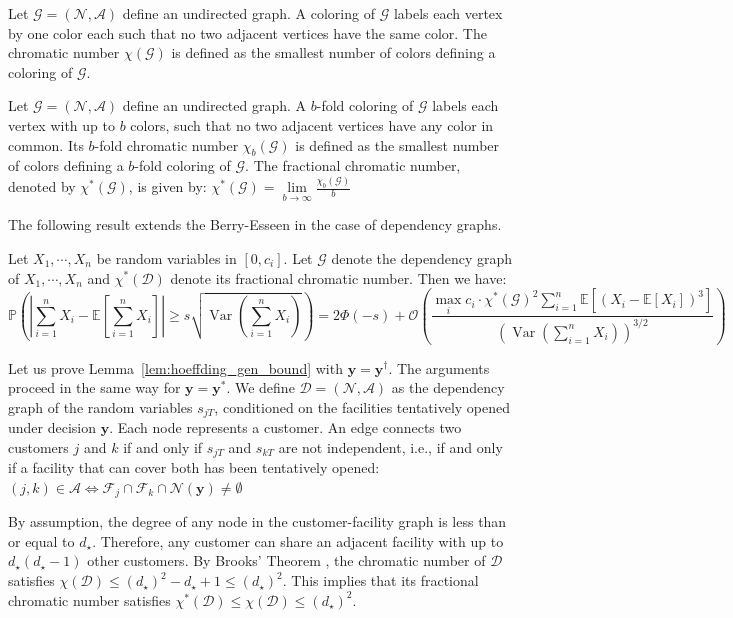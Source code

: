 \documentclass[nonblindrev]{informs3noheader}
\DeclareMathOperator{\Var}{Var}
\def\E{\mathbb{E}}
\def\P{\mathbb{P}}
\def\calA{\mathcal{A}}
\def\calD{\mathcal{D}}
\def\calF{\mathcal{F}}
\def\calG{\mathcal{G}}
\def\calN{\mathcal{N}}
\def\calO{\mathcal{O}}
\def\by{\boldsymbol{y}}
\begin{document}
\begin{definition}\label{def:chromatic}
    Let $\calG=(\calN,\calA)$ define an undirected graph. A coloring of $\calG$ labels each vertex by one color each such that no two adjacent vertices have the same color. The chromatic number $\chi(\calG)$ is defined as the smallest number of colors defining a coloring of $\calG$.
\end{definition}

\begin{definition}\label{def:Fchromatic}
    Let $\calG=(\calN,\calA)$ define an undirected graph. A $b$-fold coloring of $\calG$ labels each vertex with up to $b$ colors, such that no two adjacent vertices have any color in common. Its $b$-fold chromatic number $\chi_b(\calG)$ is defined as the smallest number of colors defining a $b$-fold coloring of $\calG$. The fractional chromatic number, denoted by $\chi^*(\calG)$, is given by: $\chi^*(\calG)=\lim\limits_{b\to\infty}\frac{\chi_b(\calG)}{b}$
\end{definition}

The following result extends the Berry-Esseen in the case of dependency graphs.
\begin{theorem}
	Let $X_1,\cdots, X_n$ be random variables in $[0,c_i]$. Let $\calG$ denote the dependency graph of $X_1,\cdots, X_n$ and $\chi^*(\calD)$ denote its fractional chromatic number. Then we have:
	\begin{equation*}
		\P\left(\left|\sum_{i=1}^n X_i - \E\left[\sum_{i=1}^n X_i\right]\right|\geq s \sqrt{\Var\left(\sum_{i=1}^n X_i\right)}\right)=2\Phi(-s) +\calO\left(\frac{\max_{i} c_i \cdot \chi^*(\calG)^2 \sum_{i=1}^n \E\left[(X_i-\E[X_i])^3\right]}{\left(\Var\left(\sum_{i=1}^n X_i\right)\right)^{3/2}}\right)
	\end{equation*}
\end{theorem}

Let us prove Lemma~\ref{lem:hoeffding_gen_bound} with $\by = \by^\dagger$. The arguments proceed in the same way for $\by = \by^*$. We define $\calD=(\calN,\calA)$ as the dependency graph of the random variables $s_{jT}$, conditioned on the facilities tentatively opened under decision $\by$. Each node represents a customer. An edge connects two customers $j$ and $k$ if and only if $s_{jT}$ and $s_{kT}$ are not independent, i.e., if and only if a facility that can cover both has been tentatively opened: $(j,k)\in\calA\iff\calF_j\cap\calF_k\cap\calN(\by)\neq\emptyset$

By assumption, the degree of any node in the customer-facility graph is less than or equal to $d_\star$. Therefore, any customer can share an adjacent facility with up to $d_\star(d_\star-1)$ other customers.
By Brooks' Theorem \citep{brooks1941colouring}, the chromatic number of $\calD$ satisfies $\chi(\calD)\leq (d_\star)^2-d_\star+1\leq (d_\star)^2$. This implies that its fractional chromatic number satisfies $\chi^*(\calD)\leq \chi(\calD)\leq (d_\star)^2$.
\end{document}
